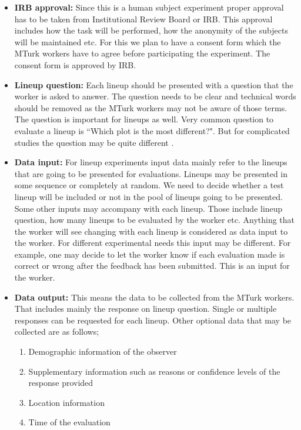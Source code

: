 \documentclass[11pt]{article}
\begin{document}
\begin{itemize}

\item {\bf IRB approval:} Since this is a human subject experiment proper approval has to be taken from Institutional Review Board or IRB. This approval includes how the task will be performed, how the anonymity of the subjects will be maintained etc. For this we plan to have a consent form which the MTurk workers have to agree before participating the experiment. The consent form is approved by IRB.
 
\item {\bf Lineup question:} Each lineup should be presented with a question that the worker is asked to answer. The question needs to be clear and technical words should be removed as the MTurk workers may not be aware of those terms. The question is important for lineups as well. Very common question to evaluate a lineup is ``Which plot is the most different?". But for complicated studies the question may be quite different \citep{majumder:socio}.

\item {\bf Data input:} For lineup experiments input data  mainly refer to the lineups that are going to be presented for evaluations. Lineups may be presented in some sequence or completely at random. We need to decide whether a test lineup will be included or not in the pool of lineups going to be presented. Some other inputs may accompany with each lineup. Those include lineup question, how many lineups to be evaluated by the worker etc. Anything that the worker will see changing with each lineup is considered as data input to the worker. For different experimental needs this input may be different. For example, one may decide to let the worker know if each evaluation made is correct or wrong after the feedback has been submitted. This is an input for the worker.

\item {\bf Data output:} This means the data to be collected from the MTurk workers. That includes mainly the response on lineup question. Single or multiple responses can be requested for each lineup. Other optional data that may be collected are as follows;

\begin{enumerate}
\item Demographic information of the observer
\item Supplementary information such as reasons or confidence levels of the response provided
\item Location information
\item Time of the evaluation
\end{enumerate}


\end{itemize}
\end{document}
